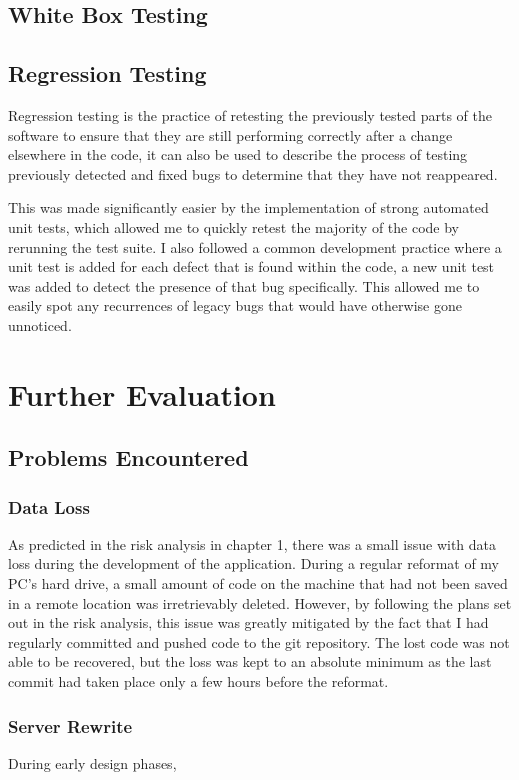 \subsection{White Box Testing}


\subsection{Regression Testing}
Regression testing is the practice of retesting the previously tested parts of the software to ensure that they are still performing correctly after a change elsewhere in the code, it can also be used to describe the process of testing previously detected and fixed bugs to determine that they have not reappeared.

This was made significantly easier by the implementation of strong automated unit tests, which allowed me to quickly retest the majority of the code by rerunning the test suite.
I also followed a common development practice where a unit test is added for each defect that is found within the code, a new unit test was added to detect the presence of that bug specifically. 
This allowed me to easily spot any recurrences of legacy bugs that would have otherwise gone unnoticed.

\section{Further Evaluation}
\subsection{Problems Encountered}
\subsubsection{Data Loss}
As predicted in the risk analysis in chapter 1, there was a small issue with data loss during the development of the application.
During a regular reformat of my PC's hard drive, a small amount of code on the machine that had not been saved in a remote location was irretrievably deleted.
However, by following the plans set out in the risk analysis, this issue was greatly mitigated by the fact that I had regularly committed and pushed code to the git repository. 
The lost code was not able to be recovered, but the loss was kept to an absolute minimum as the last commit had taken place only a few hours before the reformat.

\subsubsection{Server Rewrite}
During early design phases, 